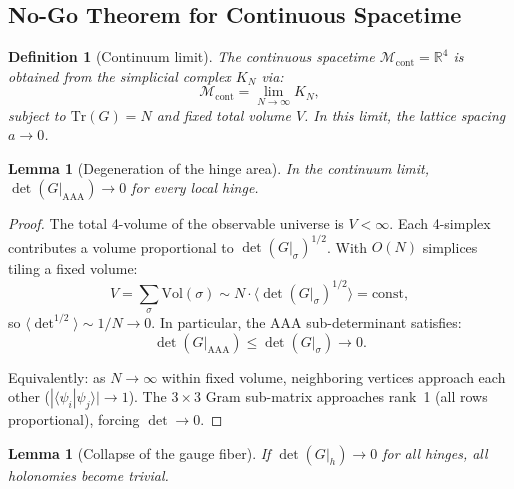 \documentclass[12pt]{article}
\newtheorem{lemma}[theorem]{Lemma}
\newtheorem{definition}[theorem]{Definition}
\theoremstyle{remark}
\theoremstyle{definition}
\newcommand{\RR}{\mathbb{R}}
\begin{document}
\subsection{No-Go Theorem for Continuous Spacetime}
\label{sec:nogo}

\begin{definition}[Continuum limit]
\label{def:continuum}
The continuous spacetime $\mathcal{M}_{\mathrm{cont}} = \RR^4$ is
obtained from the simplicial complex $K_N$ via:
\begin{equation}
\mathcal{M}_{\mathrm{cont}} = \lim_{N \to \infty} K_N,
\end{equation}
subject to $\mathrm{Tr}(G) = N$ and fixed total volume $V$.
In this limit, the lattice spacing $a \to 0$.
\end{definition}

\begin{lemma}[Degeneration of the hinge area]
\label{lem:degen}
In the continuum limit, $\det(G|_{\mathrm{AAA}}) \to 0$ for every
local hinge.
\end{lemma}

\begin{proof}
The total 4-volume of the observable universe is $V < \infty$. Each
4-simplex contributes a volume proportional to $\det(G|_\sigma)^{1/2}$.
With $O(N)$ simplices tiling a fixed volume:
\begin{equation}
V = \sum_\sigma \mathrm{Vol}(\sigma) \sim N \cdot
\langle \det(G|_\sigma)^{1/2} \rangle = \mathrm{const},
\end{equation}
so $\langle \det^{1/2} \rangle \sim 1/N \to 0$. In particular, the
AAA sub-determinant satisfies:
\begin{equation}
\det(G|_{\mathrm{AAA}}) \leq \det(G|_\sigma) \to 0.
\end{equation}

Equivalently: as $N \to \infty$ within fixed volume, neighboring
vertices approach each other ($|\langle\psi_i|\psi_j\rangle| \to 1$).
The $3 \times 3$ Gram sub-matrix approaches rank~1 (all rows
proportional), forcing $\det \to 0$.
\end{proof}

\begin{lemma}[Collapse of the gauge fiber]
\label{lem:fiber}
If $\det(G|_h) \to 0$ for all hinges, all holonomies become trivial.
\end{lemma}
\end{document}
